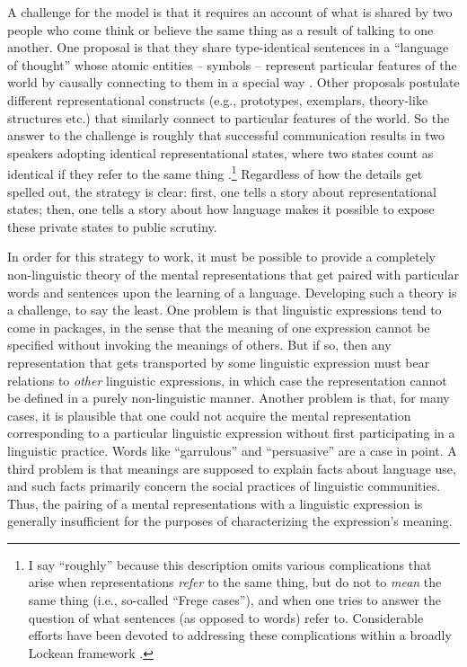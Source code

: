 A challenge for the model is that it requires an account of what is shared by two people who come think or believe the same thing as a result of talking to one another. One proposal is that they share type-identical sentences in a ``language of thought'' whose atomic entities -- symbols -- represent particular features of the world by causally connecting to them in a special way \citep{Fodor:1998}. Other proposals postulate different representational constructs (e.g., prototypes, exemplars, theory-like structures etc.) that similarly connect to particular features of the world. So the answer to the challenge is roughly that successful communication results in two speakers adopting identical representational states, where two states count as identical if they refer to the same thing \citep{Fodor:1998,Horwich:2005}.\footnote{I say ``roughly'' because this description omits various complications that arise when representations \textit{refer} to the same thing, but do not to \textit{mean} the same thing (i.e., so-called ``Frege cases''), and when one tries to answer the question of what sentences (as opposed to words) refer to. Considerable efforts have been devoted to addressing these complications within a broadly Lockean framework \citep[see e.g.,][]{Speaks:2014}.} Regardless of how the details get spelled out, the strategy is clear: first, one tells a story about representational states; then, one tells a story about how language makes it possible to expose these private states to public scrutiny. 

In order for this strategy to work, it must be possible to provide a completely non-linguistic theory of the mental representations that get paired with particular words and sentences upon the learning of a language. Developing such a theory is a challenge, to say the least. One problem is that linguistic expressions tend to come in packages, in the sense that the meaning of one expression cannot be specified without invoking the meanings of others. But if so, then any representation that gets transported by some linguistic expression must bear relations to \textit{other} linguistic expressions, in which case the representation cannot be defined in a purely non-linguistic manner. Another problem is that, for many cases, it is plausible that one could not acquire the mental representation corresponding to a particular linguistic expression without first participating in a linguistic practice. Words like ``garrulous'' and ``persuasive'' are a case in point. A third problem is that meanings are supposed to explain facts about language use, and such facts primarily concern the social practices of linguistic communities. Thus, the pairing of a mental representations with a linguistic expression is generally insufficient for the purposes of characterizing the expression's meaning. 

